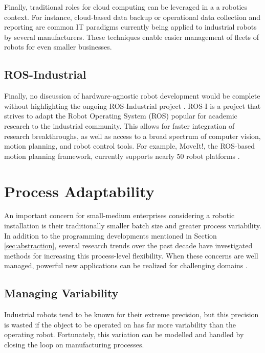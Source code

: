 Finally, traditional roles for cloud computing can be leveraged in a a robotics context. For instance, cloud-based data backup \cite{Hookings2013} or operational data collection and reporting \cite{Hookings2013b} are common IT paradigms currently being applied to industrial robots by several manufacturers. These techniques enable easier management of fleets of robots for even smaller businesses.

\subsection{ROS-Industrial}
Finally, no discussion of hardware-agnostic robot development would be complete without highlighting the ongoing ROS-Industrial project \cite{Edwards2012}. ROS-I is a project that strives to adapt the Robot Operating System (ROS) popular for academic research to the industrial community. This allows for faster integration of research breakthroughs, as well as access to a broad spectrum of computer vision, motion planning, and robot control tools. For example, MoveIt!, the ROS-based motion planning framework, currently supports nearly 50 robot platforms
\cite{MoveItUserCommunity2014}.





\section{Process Adaptability}
\label{sec:adaptability}
An important concern for small-medium enterprises considering a robotic installation is their traditionally smaller batch size and greater process variability. In addition to the programming developments mentioned in Section \ref{sec:abstraction}, several research trends over the past decade have investigated methods for increasing this process-level flexibility. When these concerns are well managed, powerful new applications can be realized for challenging domains \cite{Spencer1996}.

\subsection{Managing Variability}
Industrial robots tend to be known for their extreme precision, but this precision is wasted if the object to be operated on has far more variability than the operating robot. Fortunately, this variation can be modelled and handled by closing the loop on manufacturing processes.

